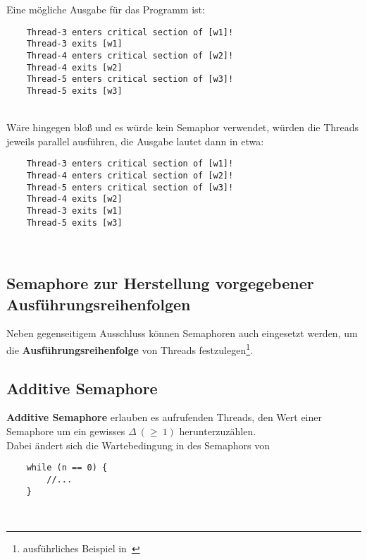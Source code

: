 Eine mögliche Ausgabe für das Programm ist:\\

\noindent
\begin{verbatim}
    Thread-3 enters critical section of [w1]!
    Thread-3 exits [w1]
    Thread-4 enters critical section of [w2]!
    Thread-4 exits [w2]
    Thread-5 enters critical section of [w3]!
    Thread-5 exits [w3]
\end{verbatim}\\

\noindent
Wäre  hingegen bloß  und es würde kein Semaphor verwendet, würden die Threads jeweils parallel  ausführen, die Ausgabe lautet dann in etwa:


\begin{verbatim}
    Thread-3 enters critical section of [w1]!
    Thread-4 enters critical section of [w2]!
    Thread-5 enters critical section of [w3]!
    Thread-4 exits [w2]
    Thread-3 exits [w1]
    Thread-5 exits [w3]
\end{verbatim}\\

\subsection{Semaphore zur Herstellung vorgegebener Ausführungsreihenfolgen}

Neben gegenseitigem Ausschluss können Semaphoren auch eingesetzt werden, um die \textbf{Ausführungsreihenfolge} von Threads festzulegen\footnote{ausführliches Beispiel in~\cite[104]{Oec22}}.

\subsection{Additive Semaphore}
\textbf{Additive Semaphore} erlauben es aufrufenden Threads, den Wert einer Semaphore um ein gewisses $\Delta\ (\geq\ 1)$ herunterzuzählen.\\

\noindent
Dabei ändert sich die Wartebedingung in des Semaphors von

\begin{verbatim}
    while (n == 0) {
        //...
    }
\end{verbatim}\\


